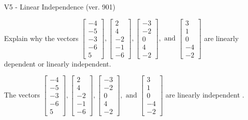 \begin{exercise}
  \begin{exerciseTitle}V5 - Linear Independence (ver. 901)\end{exerciseTitle}
  \begin{exerciseStatement}
    Explain why the vectors \(\left[\begin{array}{r}
-4 \\
-5 \\
-3 \\
-6 \\
5
\end{array}\right] , \left[\begin{array}{r}
2 \\
4 \\
-2 \\
-1 \\
-6
\end{array}\right] , \left[\begin{array}{r}
-3 \\
-2 \\
0 \\
4 \\
-2
\end{array}\right] , \text{ and } \left[\begin{array}{r}
3 \\
1 \\
0 \\
-4 \\
-2
\end{array}\right]\) are linearly dependent or linearly independent.	


  \end{exerciseStatement}
  \begin{exerciseAnswer}
   The vectors \(\left[\begin{array}{r}
-4 \\
-5 \\
-3 \\
-6 \\
5
\end{array}\right] , \left[\begin{array}{r}
2 \\
4 \\
-2 \\
-1 \\
-6
\end{array}\right] , \left[\begin{array}{r}
-3 \\
-2 \\
0 \\
4 \\
-2
\end{array}\right] , \text{ and } \left[\begin{array}{r}
3 \\
1 \\
0 \\
-4 \\
-2
\end{array}\right]\) are 
  	 linearly independent  .
  


  \end{exerciseAnswer}
\end{exercise}